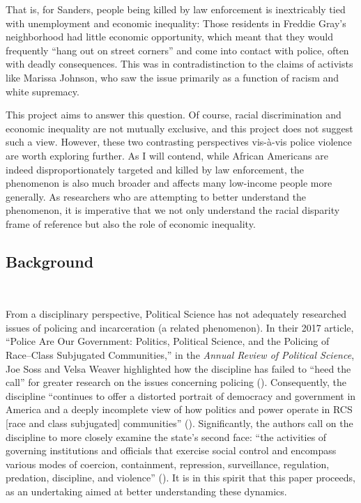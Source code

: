 \documentclass[12pt]{article}
\begin{document}
That is, for Sanders, people being killed by law enforcement is inextricably tied with unemployment and economic inequality: Those residents in Freddie Gray’s neighborhood had little economic opportunity, which meant that they would frequently “hang out on street corners” and come into contact with police, often with deadly consequences. This was in contradistinction to the claims of activists like Marissa Johnson, who saw the issue primarily as a function of racism and white supremacy.

This project aims to answer this question. Of course, racial discrimination and economic inequality are not mutually exclusive, and this project does not suggest such a view. However, these two contrasting perspectives vis-à-vis police violence are worth exploring further. As I will contend, while African Americans are indeed disproportionately targeted and killed by law enforcement, the phenomenon is also much broader and affects many low-income people more generally. As researchers who are attempting to better understand the phenomenon, it is imperative that we not only understand the racial disparity frame of reference but also the role of economic inequality.

\subsection{Background}\

From a disciplinary perspective, Political Science has not adequately researched issues of policing and incarceration (a related phenomenon). In their 2017 article, “Police Are Our Government: Politics, Political Science, and the Policing of Race–Class Subjugated Communities,” in the \textit{Annual Review of Political Science}, Joe Soss and Velsa Weaver highlighted how the discipline has failed to “heed the call” for greater research on the issues concerning policing (\citeyear[568]{sossPoliceAreOur2017}). Consequently, the discipline “continues to offer a distorted portrait of democracy and government in America and a deeply incomplete view of how politics and power operate in RCS [race and class subjugated] communities” (\cite[568]{sossPoliceAreOur2017}). Significantly, the authors call on the discipline to more closely examine the state’s second face: “the activities of governing institutions and officials that exercise social control and encompass various modes of coercion, containment, repression, surveillance, regulation, predation, discipline, and violence” (\cite[567]{sossPoliceAreOur2017}). It is in this spirit that this paper proceeds, as an undertaking aimed at better understanding these dynamics.
\end{document}
